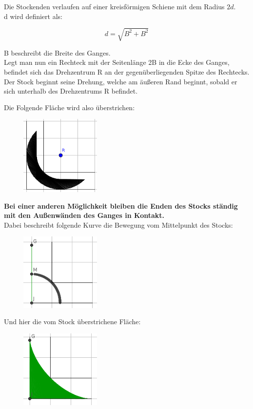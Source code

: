 \documentclass[a4paper,11pt]{article}
\begin{document}
Die Stockenden verlaufen auf einer kreisförmigen Schiene mit dem Radius $2d$. \\
d wird definiert als:

\[ d = \sqrt{B^2+B^2} \]

B beschreibt die Breite des Ganges. \\
Legt man nun ein Rechteck mit der Seitenlänge 2B in die Ecke des Ganges, befindet sich das Drehzentrum R an der gegenüberliegenden Spitze des Rechtecks. \\
Der Stock beginnt seine Drehung, welche am \"au\ss eren Rand beginnt, sobald er sich unterhalb des Drehzentrums R befindet.

Die Folgende Fl\"ache wird also \"uberstrichen:
\begin{figure}[H] 
        \centering
        \includegraphics[width=4cm]{img/A4_2.png}
\end{figure}

\textbf{Bei einer anderen M\"oglichkeit bleiben die Enden des Stocks st\"andig mit den Au\ss enw\"anden des Ganges in Kontakt.} \\
Dabei beschreibt folgende Kurve die Bewegung vom Mittelpunkt des Stocks:
\begin{figure}[H] 
        \centering
        \includegraphics[width=4cm]{img/A4_3.png}
\end{figure}

Und hier die vom Stock \"uberstrichene Fl\"ache:
\begin{figure}[H] 
        \centering
        \includegraphics[width=4cm]{img/A4_4.png}
\end{figure}
\end{document}
